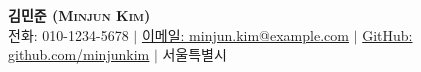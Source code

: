 \begin{center}
    \textbf{\LARGE \scshape \textcolor{accent}{김민준 (Minjun Kim)}} \\ \vspace{2pt}
    \vspace{5pt}
    \small
    전화: 010-1234-5678 $|$
    \href{mailto:minjun.kim@example.com}{이메일: \underline{minjun.kim@example.com}} $|$
    \href{https://github.com/minjunkim}{GitHub: \underline{github.com/minjunkim}} $|$
    서울특별시
\end{center}

